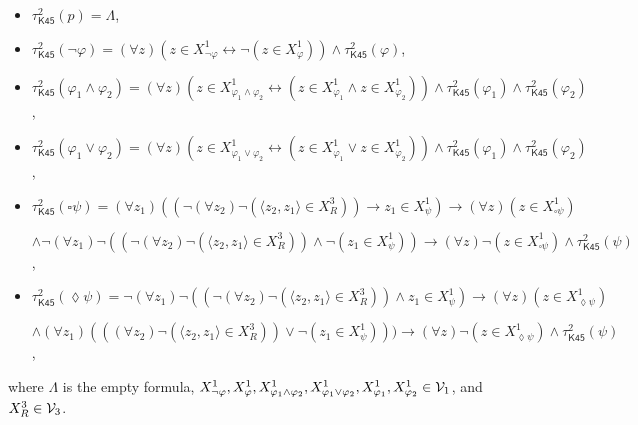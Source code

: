 \documentclass{fundam}
\renewcommand{\And}{\wedge}
\newcommand{\Or}{\vee}
\newcommand{\Kqc}{\mathsf{K45}}
\newcommand{\TKqcdue}{\tau_{\Kqc}^{2}}
\begin{document}
\begin{itemize}
\item $\TKqcdue(p) = \Lambda$,

\item $\TKqcdue(\neg \varphi) = (\forall z)(z \in X_{\neg \varphi}^{1}
\leftrightarrow \neg(z \in X_{\varphi}^{1})) \And \TKqcdue(\varphi)$,

\item $\TKqcdue(\varphi_1 \And \varphi_2) = (\forall z)(z \in
X_{\varphi_1 \And \varphi_2}^{1} \leftrightarrow (z \in
X_{\varphi_1}^{1} \And z \in X_{\varphi_2}^{1})) \And
\TKqcdue(\varphi_1) \And \TKqcdue(\varphi_2)$,

\item $\TKqcdue(\varphi_1 \Or \varphi_2) = (\forall z)(z \in
X_{\varphi_1 \Or \varphi_2}^{1} \leftrightarrow (z \in
X_{\varphi_1}^{1} \Or z \in X_{\varphi_2}^{1})) \And
\TKqcdue(\varphi_1) \And \TKqcdue(\varphi_2)$,

\item $\TKqcdue(\square\psi) = (\forall z_1)((\neg(\forall
z_2)\neg(\langle z_2,z_1\rangle \in X_R^{3})) \rightarrow z_1 \in
X_{\psi}^{1})\rightarrow (\forall z)(z \in X_{\square \psi}^{1})$

\hfill $\And \neg (\forall z_1)\neg ((\neg(\forall z_2)\neg(\langle
z_2,z_1 \rangle \in X_R^{3})) \And \neg(z_1 \in X_{\psi}^{1}))
\rightarrow (\forall z)\neg (z \in X_{\square \psi}^{1}) \And
\TKqcdue(\psi)$,

\item $\TKqcdue(\lozenge\psi) = \neg(\forall z_1)\neg ((\neg(\forall
z_2)\neg(\langle z_2,z_1\rangle \in X_R^{3})) \And z_1 \in
X_{\psi}^{1})\rightarrow (\forall z)(z \in X_{\lozenge \psi}^{1})$

\hfill $\And (\forall z_1)(((\forall z_2)\neg (\langle z_2,z_1\rangle
\in X_R^{3})) \Or \neg(z_1 \in X_{\psi}^{1}))) \rightarrow (\forall
z)\neg (z \in X_{\lozenge \psi}^{1}) \And \TKqcdue(\psi)$,
\end{itemize}
where $\Lambda$ is the empty formula, $X_{\neg \varphi}^{1}, X_{\varphi}^{1}, X_{\varphi_1 \And \varphi_2}^{1}, X_{\varphi_1 \Or \varphi_2}^{1}, X_{\varphi_1}^{1}, X_{\varphi_2}^{1} \in {\cal V}_1$, and $X_R^3\in {\cal V}_3$.
\end{document}

